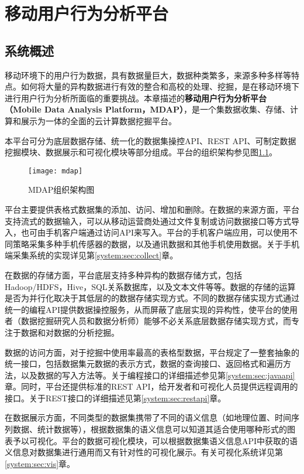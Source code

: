 \chapter{移动用户行为分析平台}
\label{cha:system}

\section{系统概述}
\label{system:sec:intro}
移动环境下的用户行为数据，具有数据量巨大，数据种类繁多，来源多种多样等特点。如何将大量的异构数据进行有效的整合和高校的处理、挖掘，是在移动环境下进行用户行为分析所面临的重要挑战。本章描述的\textbf{移动用户行为分析平台（Mobile Data Analysis Platform，MDAP）}，是一个集数据收集、存储、计算和展示为一体的全面的云计算数据挖掘平台。

本平台可分为底层数据存储、统一化的数据集操控API、REST API、可制定数据挖掘模块、数据展示和可视化模块等部分组成。平台的组织架构参见图\ref{mdap:fig:architecture}。

\begin{figure}[htbp]
  \centering
    \texttt{[image: mdap]}
  \caption{MDAP组织架构图}
  \label{mdap:fig:architecture}
\end{figure}

平台主要提供表格式数据集的添加、访问、增加和删除。在数据的来源方面，平台支持流式的数据输入，可以从移动运营商处通过文件复制或访问数据接口等方式导入，也可由手机客户端通过访问API来写入。平台的手机客户端应用，可以使用不同策略采集多种手机传感器的数据，以及通讯数据和其他手机使用数据。关于手机端采集系统的实现详见第\ref{system:sec:collect}章。

在数据的存储方面，平台底层支持多种异构的数据存储方式，包括Hadoop/HDFS，Hive，SQL关系数据库，以及文本文件等等。数据的存储的运算是否为并行化取决于其低层的的数据存储实现方式。不同的数据存储实现方式通过统一的编程API提供数据操控服务，从而屏蔽了底层实现的异构性，使平台的使用者（数据挖掘研究人员和数据分析师）能够不必关系底层数据存储实现方式，而专注于数据和对数据的分析挖掘。

数据的访问方面，对于挖掘中使用率最高的表格型数据，平台规定了一整套抽象的统一接口，包括数据集元数据的表示方式，数据的查询接口、返回格式和遍历方法，以及数据的写入方法等。关于编程接口的详细描述参见第\ref{system:sec:javaapi}章。同时，平台还提供标准的REST API，给开发者和可视化人员提供远程调用的接口。关于REST接口的详细描述见第\ref{system:sec:restapi}章。

在数据展示方面，不同类型的数据集携带了不同的语义信息（如地理位置、时间序列数据、统计数据等），根据数据集的语义信息可以知道其适合使用哪种形式的图表予以可视化。平台的数据可视化模块，可以根据数据集语义信息API中获取的语义信息对数据集进行通用而又有针对性的可视化展示。有关可视化系统详见第\ref{system:sec:vis}章。



